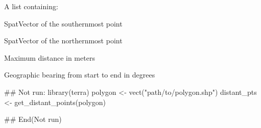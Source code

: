 \documentclass[letterpaper]{book}
\begin{document}
%
\begin{Value}
A list containing:
\begin{ldescription}
\item[\code{start\_ll}] SpatVector of the southernmost point
\item[\code{end\_ll}] SpatVector of the northernmost point
\item[\code{distance}] Maximum distance in meters
\item[\code{bearing}] Geographic bearing from start to end in degrees
\end{ldescription}
\end{Value}
%
\begin{Examples}
\begin{ExampleCode}
## Not run: 
library(terra)
polygon <- vect("path/to/polygon.shp")
distant_pts <- get_distant_points(polygon)

## End(Not run)
\end{ExampleCode}
\end{Examples}
\printindex{}
\end{document}
